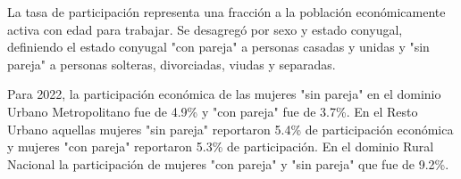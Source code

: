 La tasa de participación representa una fracción a la población económicamente activa con edad para trabajar. Se desagregó por sexo y estado conyugal, definiendo el estado conyugal "con pareja" a personas casadas y unidas y "sin pareja" a personas solteras, divorciadas, viudas y separadas.  

Para 2022, la participación económica de las mujeres "sin pareja" en el dominio Urbano Metropolitano fue de 4.9\% y "con pareja" fue de 3.7\%. En el Resto Urbano aquellas mujeres "sin pareja" reportaron 5.4\% de participación económica y mujeres "con pareja" reportaron 5.3\% de participación. En el dominio Rural Nacional la participación de mujeres "con pareja" y "sin pareja" que fue de 9.2\%. 
